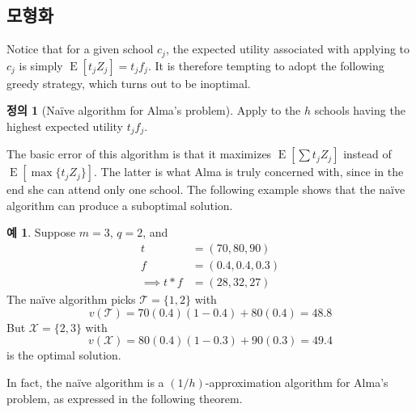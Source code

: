 \documentclass[12pt]{article} %
\newif\ifEN
\theoremstyle{definition}
\newtheorem{example}{Example}
\newtheorem{definition}{Definition}
\theoremstyle{definition}
\newtheorem{example}{예}
\newtheorem{definition}{정의}
\begin{document}
\ifEN \subsection{Approximation properties of a na\"ive solution}  \else \subsection{모형화} \fi
Notice that for a given school $c_j$, the expected utility associated with applying to $c_j$ is simply $\operatorname{E}[t_j Z_j] = t_j f_j$. It is therefore tempting to adopt the following greedy strategy, which turns out to be inoptimal.
\begin{definition}[Na\"ive algorithm for Alma’s problem] \label{naivealgorithm}
Apply to the $h$ schools having the highest expected utility $t_j f_j$.
\end{definition}
The basic error of this algorithm is that it maximizes $\operatorname{E}\left[\sum t_j Z_j \right]$ instead of $\operatorname{E}\left[\max \{t_j Z_j\} \right]$. The latter is what Alma is truly concerned with, since in the end she can attend only one school. The following example shows that the na\"ive algorithm can produce a suboptimal solution.
\begin{example}
Suppose $m=3$, $q=2$, and
\begin{align*}
t &= (70, 80, 90) \\
f &= (0.4, 0.4, 0.3) \\
\implies t * f &= (28, 32, 27)
\end{align*}
The na\"ive algorithm picks $\mathcal{T} = \{1, 2\}$ with 
\[v(\mathcal{T}) = 70(0.4)(1-0.4) + 80(0.4) = 48.8\]
But $\mathcal{X} = \{2, 3\}$ with
\[v(\mathcal{X}) = 80(0.4)(1-0.3) + 90(0.3) = 49.4\]
is the optimal solution. 
\end{example}

In fact, the na\"ive algorithm is a $(1/h)$-approximation algorithm for Alma’s problem, as expressed in the following theorem.
\end{document}
